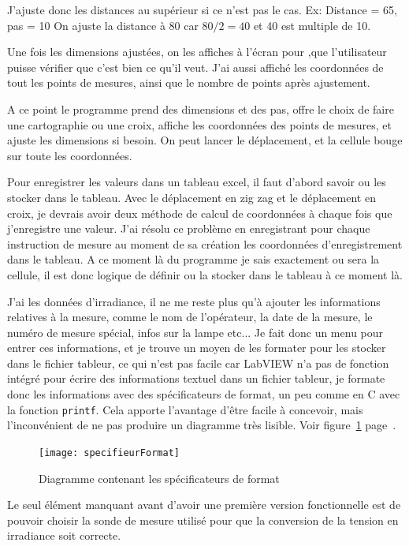 \documentclass[a4paper, 12pt]{article}
\begin{document}
J'ajuste donc les distances au supérieur si ce n'est pas le cas. Ex:  
Distance = 65, pas = 10  
On ajuste la distance à 80 car $80/2 = 40$ et 40 est multiple de 10.  
  
Une fois les dimensions ajustées, on les affiches à l'écran pour ,que l'utilisateur puisse vérifier que c'est bien ce qu'il veut.  
J'ai aussi affiché les coordonnées de tout les points de mesures, ainsi que le nombre de points après ajustement.  
  
A ce point le programme prend des dimensions et des pas, offre le choix de faire une cartographie ou une croix, affiche les coordonnées des points de mesures, et ajuste les dimensions si besoin.  
On peut lancer le déplacement, et la cellule bouge sur toute les coordonnées.  
  
Pour enregistrer les valeurs dans un tableau excel, il faut d'abord savoir ou les stocker dans le tableau.  
Avec le déplacement en zig zag et le déplacement en croix, je devrais avoir deux méthode de calcul de coordonnées à chaque fois que j'enregistre une valeur.  
J'ai résolu ce problème en enregistrant pour chaque instruction de mesure au moment de sa création les coordonnées d'enregistrement dans le tableau. A ce moment là du programme je sais exactement ou sera la cellule, il est donc logique de définir ou la stocker dans le tableau à ce moment là.  
  
 J'ai les données d'irradiance, il ne me reste plus qu'à ajouter les informations relatives à la mesure, comme le nom de l'opérateur, la date de la mesure, le numéro de mesure spécial, infos sur la lampe etc...
Je fait donc un menu pour entrer ces informations, et je trouve un moyen de les formater pour les stocker dans le fichier tableur, ce qui n'est pas facile car LabVIEW n'a pas de fonction intégré pour écrire des informations textuel dans un fichier tableur, je formate donc les informations avec des spécificateurs de format, un peu comme en C avec la fonction \verb|printf|.
Cela apporte l'avantage d'être facile à concevoir, mais l'inconvénient de ne pas produire un diagramme très lisible.
Voir figure~\ref{fig:specifieurFormat} page~\pageref{fig:specifieurFormat}.

\begin{figure}[h]
	\centering
	\texttt{[image: specifieurFormat]}
	\caption{Diagramme contenant les spécificateurs de format}
	\label{fig:specifieurFormat}
\end{figure}
  
Le seul élément manquant avant d'avoir une première version fonctionnelle est de pouvoir choisir la sonde de mesure utilisé pour que la conversion de la tension en irradiance soit correcte. 
\end{document}
